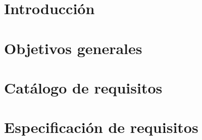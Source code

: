 
\section{Introducción}

\section{Objetivos generales}

\section{Catálogo de requisitos}

\section{Especificación de requisitos}


